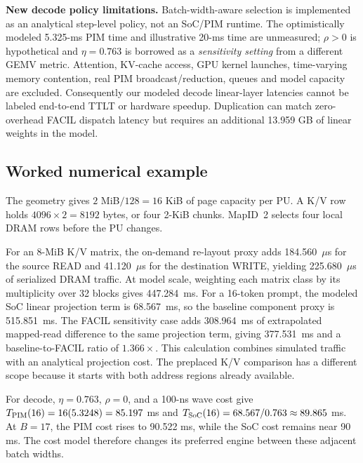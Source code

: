 \documentclass[conference,10pt]{IEEEtran}
\begin{document}
\textbf{New decode policy limitations.} Batch-width-aware selection
is implemented as an analytical step-level policy, not an SoC/PIM
runtime. The optimistically modeled 5.325-ms PIM time and illustrative
20-ms time are unmeasured; $\rho>0$ is hypothetical and $\eta=0.763$
is borrowed as a \emph{sensitivity setting} from a different GEMV
metric. Attention, KV-cache access, GPU kernel launches, time-varying
memory contention, real PIM broadcast/reduction, queues and model
capacity are excluded. Consequently our modeled decode linear-layer
latencies cannot be labeled end-to-end TTLT or hardware speedup.
Duplication can match zero-overhead FACIL dispatch latency but
requires an additional 13.959 GB of linear weights in the model.

\subsection{Worked numerical example}
The geometry gives $2$ MiB$/128=16$ KiB of page capacity per PU.
A K/V row holds $4096\times2=8192$ bytes, or four 2-KiB chunks.
MapID~2 selects four local DRAM rows before the PU changes.

For an 8-MiB K/V matrix, the on-demand re-layout proxy adds
184.560~$\mu$s for the source READ and 41.120~$\mu$s for the
destination WRITE, yielding 225.680~$\mu$s of serialized DRAM
traffic. At model scale, weighting each matrix class by its
multiplicity over 32 blocks gives 447.284~ms. For a 16-token
prompt, the modeled SoC linear projection term is 68.567~ms,
so the baseline component proxy is 515.851~ms. The FACIL
sensitivity case adds 308.964~ms of extrapolated mapped-read
difference to the same projection term, giving 377.531~ms
and a baseline-to-FACIL ratio of $1.366\times$. This calculation
combines simulated traffic with an analytical projection cost.
The preplaced K/V comparison has a different scope because
it starts with both address regions already available.

For decode, $\eta=0.763$, $\rho=0$, and a 100-ns wave cost
give $T_{\rm PIM}(16)=16(5.3248)=85.197$ ms and
$T_{\rm SoC}(16)=68.567/0.763\approx89.865$ ms.
At $B=17$, the PIM cost rises to 90.522 ms, while the SoC
cost remains near 90 ms. The cost model therefore changes
its preferred engine between these adjacent batch widths.
\end{document}
